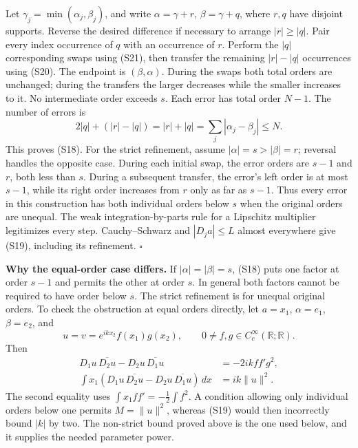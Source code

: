 \documentclass[
  11pt,
]{article}
\makeatletter
\let\ReaderOriginalAnchorStart\hyper@anchorstart
\let\ReaderOriginalAnchorEnd\hyper@anchorend
\let\ReaderPendingAliases\@empty
\def\ReaderArmAliases#1{\gdef\ReaderPendingAliases{#1}}
\def\hyper@anchorstart#1{\ReaderIfNativeAnchorTF{#1}{\ReaderPendingAliases\global\let\ReaderPendingAliases\@empty}{}\ReaderOriginalAnchorStart{#1}}
\makeatother
\begin{document}
Let \(\gamma_j=\min(\alpha_j,\beta_j)\), and write \(\alpha=\gamma+r\),
\(\beta=\gamma+q\), where \(r,q\) have disjoint supports. Reverse the
desired difference if necessary to arrange \(|r|\geq|q|\). Pair every
index occurrence of \(q\) with an occurrence of \(r\). Perform the
\(|q|\) corresponding swaps using (S21), then transfer the remaining
\(|r|-|q|\) occurrences using (S20). The endpoint is \((\beta,\alpha)\).
During the swaps both total orders are unchanged; during the transfers
the larger decreases while the smaller increases to it. No intermediate
order exceeds \(s\). Each error has total order \(N-1\). The number of
errors is \[
 2|q|+(|r|-|q|)=|r|+|q|
                =\sum_j|\alpha_j-\beta_j|\leq N.
\] This proves (S18). For the strict refinement, assume
\(|\alpha|=s>|\beta|=r\); reversal handles the opposite case. During
each initial swap, the error orders are \(s-1\) and \(r\), both less
than \(s\). During a subsequent transfer, the error's left order is at
most \(s-1\), while its right order increases from \(r\) only as far as
\(s-1\). Thus every error in this construction has both individual
orders below \(s\) when the original orders are unequal. The weak
integration-by-parts rule for a Lipschitz multiplier legitimizes every
step. Cauchy--Schwarz and \(|D_ja|\leq L\) almost everywhere give (S19),
including its refinement. \(\square\)

\textbf{Why the equal-order case differs.} If \(|\alpha|=|\beta|=s\),
(S18) puts one factor at order \(s-1\) and permits the other at order
\(s\). In general both factors cannot be required to have order below
\(s\). The strict refinement is for unequal original orders. To check
the obstruction at equal orders directly, let \(a=x_1\), \(\alpha=e_1\),
\(\beta=e_2\), and \[
 u=v=e^{ikx_2}f(x_1)g(x_2),\qquad
 0\ne f,g\in C_c^\infty(\mathbb R;\mathbb R).
\] Then \[
\begin{split}
 D_1u\,\overline{D_2u}-D_2u\,\overline{D_1u}
     &=-2ik f f'g^2,\\
 \int x_1(D_1u\,\overline{D_2u}-D_2u\,\overline{D_1u})\,dx
     &=ik\|u\|^2.
\end{split}                                                       \tag{S22}
\] The second equality uses \(\int x_1ff'=-\frac12\int f^2\). A
condition allowing only individual orders below one permits
\(M=\|u\|^2\), whereas (S19) would then incorrectly bound \(|k|\) by
two. The non-strict bound proved above is the one used below, and it
supplies the needed parameter power.

\ReaderArmAliases{\ReaderOriginalAnchorStart{AN03-SUC-005}\ReaderOriginalAnchorEnd\begingroup\expandafter\def\csname @currentHref\endcsname{AN03-SUC-005}\label{AN03-SUC-005}\endgroup\ReaderOriginalAnchorStart{an03-suc-005-from-a-linear-weight-to-a-curved-one}\ReaderOriginalAnchorEnd\begingroup\expandafter\def\csname @currentHref\endcsname{an03-suc-005-from-a-linear-weight-to-a-curved-one}\label{an03-suc-005-from-a-linear-weight-to-a-curved-one}\endgroup\ReaderOriginalAnchorStart{5-from-a-linear-weight-to-a-curved-one}\ReaderOriginalAnchorEnd\begingroup\expandafter\def\csname @currentHref\endcsname{5-from-a-linear-weight-to-a-curved-one}\label{5-from-a-linear-weight-to-a-curved-one}\endgroup\ReaderOriginalAnchorStart{from-a-linear-weight-to-a-curved-one}\ReaderOriginalAnchorEnd}
\end{document}
